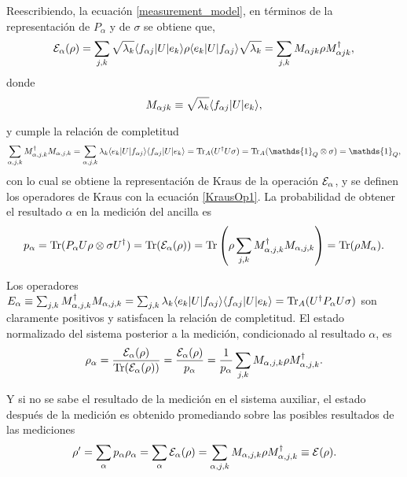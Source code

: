 Reescribiendo, la ecuación {\ref{measurement_model}}, en términos de la representación de $P_\alpha$ y de $\sigma$ se obtiene que,
\begin{equation}
    \mathcal{E}_\alpha(\rho)=\sum_{j,k}\sqrt{\lambda_k}\langle f_{\alpha j}|U|e_k\rangle \rho \langle e_k|U|f_{\alpha j}\rangle \sqrt{\lambda_k}=\sum_{j,k}M_{\alpha j k}\rho M_ {\alpha j k}^\dagger,
\end{equation}
donde \begin{equation} \label{KrausOp1}
    M_{\alpha j k}\equiv \sqrt{\lambda_k}\langle f_{\alpha j}|U|e_k\rangle, 
\end{equation}

y cumple la relación de completitud \[\sum_{\alpha, j,k} M_{\alpha,j,k}^\dagger M_{\alpha,j,k}=\sum_{\alpha, j,k} \lambda_k \la e_k|U|f_{\alpha j}\ra \la f_{\alpha j}|U|e_k\ra= \tr_A(U^\dagger U \sigma)=\tr_A(\mathds{1}_Q\otimes\sigma)=\mathds{1}_Q,\] con lo cual se obtiene la representación de Kraus de la operación $\mathcal{E}_\alpha$, y se definen los operadores de Kraus con la ecuación {\ref{KrausOp1}}. La probabilidad de obtener el resultado $\alpha$ en la medición del ancilla es {\cite{unm2014}}
\begin{equation}
    p_\alpha={\rm Tr}(P_\alpha U\rho\otimes\sigma U^\dagger)={\rm Tr}(\mathcal{E}_\alpha(\rho))={\rm Tr}\left(\rho \sum _{j,k} M_{\alpha, j,k}^\dagger M_{\alpha,j,k}\right)={\rm Tr}(\rho M_\alpha).
\end{equation}


Los operadores $E_\alpha \equiv \sum _{j,k} M_{\alpha, j,k}^\dagger M_{\alpha,j,k}=\sum_{j,k} \lambda_k \langle e_k|U|f_{\alpha j}\rangle \langle f_{\alpha j}|U|e_k\rangle={\rm Tr}_A(U^\dagger P_\alpha U\sigma) $ son claramente positivos y satisfacen la relación de completitud. El estado normalizado del sistema posterior a la medición, condicionado al resultado $\alpha$, es {\cite{unm2014}}
\begin{equation}
    \rho_\alpha =\dfrac{\mathcal{E}_\alpha (\rho)}{{\rm Tr}(\mathcal{E}_\alpha(\rho))}=\dfrac{\mathcal{E}_\alpha(\rho)}{p_\alpha}=\dfrac{1}{p_\alpha}\sum_{j,k}M_{\alpha,j,k}\rho M_{\alpha,j,k}^\dagger.
\end{equation}

Y si no se sabe el resultado de la medición en el sistema auxiliar, el estado después de la medición es obtenido promediando sobre las posibles resultados de las mediciones {\cite{unm2014}}
\begin{equation}
    \rho'=\sum_\alpha p_\alpha \rho_\alpha=\sum_\alpha \mathcal{E}_\alpha(\rho)=\sum_{\alpha,j,k} M_{\alpha,j,k}\rho M_{\alpha,j,k}^\dagger\equiv\mathcal{E}(\rho).
\end{equation}


